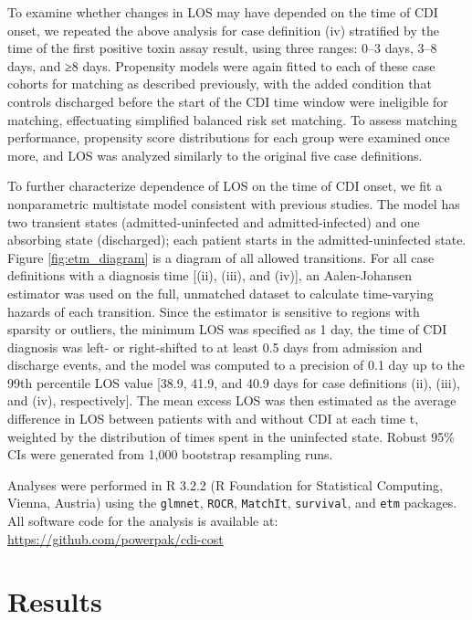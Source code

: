 To examine whether changes in LOS may have depended on the time of CDI onset, we repeated the above analysis for case definition (iv) stratified by the time of the first positive toxin assay result, using three ranges: 0–3 days, 3–8 days, and ≥8 days. Propensity models were again fitted to each of these case cohorts for matching as described previously, with the added condition that controls discharged before the start of the CDI time window were ineligible for matching, effectuating simplified balanced risk set matching.\autocite{Li2001} To assess matching performance, propensity score distributions for each group were examined once more, and LOS was analyzed similarly to the original five case definitions.

To further characterize dependence of LOS on the time of CDI onset, we fit a nonparametric multistate model consistent with previous studies.\autocite{Mitchell2014,Stevens2015,VanKleef2014} The model has two transient states (admitted-uninfected and admitted-infected) and one absorbing state (discharged); each patient starts in the admitted-uninfected state. Figure \ref{fig:etm_diagram} is a diagram of all allowed transitions. For all case definitions with a diagnosis time [(ii), (iii), and (iv)], an Aalen-Johansen estimator was used on the full, unmatched dataset to calculate time-varying hazards of each transition. Since the estimator is sensitive to regions with sparsity or outliers, the minimum LOS was specified as 1 day, the time of CDI diagnosis was left- or right-shifted to at least 0.5 days from admission and discharge events, and the model was computed to a precision of 0.1 day up to the 99th percentile LOS value [38.9, 41.9, and 40.9 days for case definitions (ii), (iii), and (iv), respectively]. The mean excess LOS was then estimated as the average difference in LOS between patients with and without CDI at each time t, weighted by the distribution of times spent in the uninfected state. Robust 95\% CIs were generated from 1,000 bootstrap resampling runs.

Analyses were performed in R 3.2.2 (R Foundation for Statistical Computing, Vienna, Austria) using the \texttt{glmnet},\autocite{Friedman2010} \texttt{ROCR},\autocite{Sing2005} \texttt{MatchIt},\autocite{Ho2011} \texttt{survival}, and \texttt{etm}\autocite{Allignol2011} packages. All software code for the analysis is available at: \url{https://github.com/powerpak/cdi-cost}

\section{Results}

